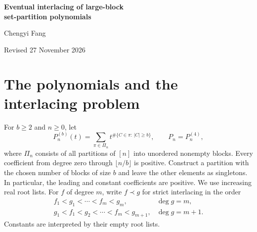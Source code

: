 \documentclass[11pt]{article}
\begin{document}
\begin{center}
{\LARGE\bfseries Eventual interlacing of large-block\\[2pt] set-partition polynomials\par}
\vspace{1ex}
Chengyi Fang\par
\vspace{0.3ex}
Revised 27 November 2026
\end{center}

\begin{abstract}
Let \(P_n(t)\) count set partitions of \([n]\) by the number of blocks of size at least four. For all sufficiently large \(n\), its \(\lfloor n/4\rfloor\) zeros are simple and negative, and \(P_n\) interlaces \(P_{n+j}\) strictly in the prescribed direction for \(1\le j\le4\). The proof matches absolute zero counts at a reciprocal-polynomial limit and an Airy limit, using uniform saddle estimates between them. The global angular minimum on a bounded range of radii is certified with outward-rounded interval arithmetic. We give the limiting empirical zero distribution, fixed-rank asymptotics and adjacent-row displacement at the Airy edge, and effective bounds at both ends. Integer and interval computations certify every nonconstant row through \(2004\) and the four interlacing gaps within that range. We also prove an all-threshold likelihood-ratio comparison between coefficient rows and their derivatives.
\end{abstract}

\section{The polynomials and the interlacing problem}

For \(b\ge2\) and \(n\ge0\), let
\[
 P^{(b)}_n(t)=\sum_{\pi\in\Pi_n}t^{\#\{C\in\pi:\,|C|\ge b\}},
 \qquad P_n=P^{(4)}_n,
\]
where \(\Pi_n\) consists of all partitions of \([n]\) into unordered nonempty blocks. Every coefficient from degree zero through \(\lfloor n/b\rfloor\) is positive. Construct a partition with the chosen number of blocks of size \(b\) and leave the other elements as singletons. In particular, the leading and constant coefficients are positive. We use increasing real root lists. For \(f\) of degree \(m\), write \(f\prec g\) for strict interlacing in the order
\[
 \begin{array}{ll}
 f_1<g_1<\cdots<f_m<g_m,& \deg g=m,\\
 g_1<f_1<g_2<\cdots<f_m<g_{m+1},&\deg g=m+1.
 \end{array}
\]
Constants are interpreted by their empty root lists.
\end{document}
